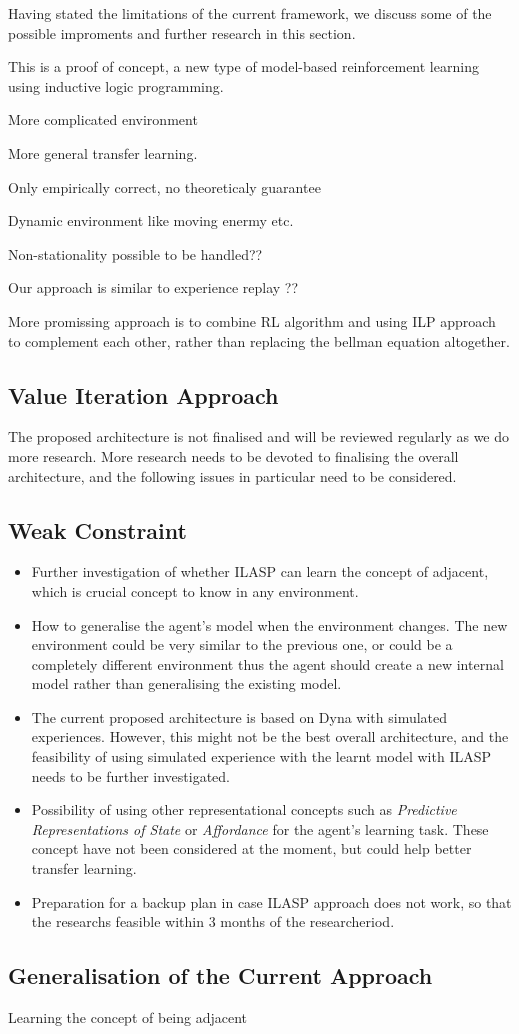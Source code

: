 Having stated the limitations of the current framework, we discuss some of the possible improments and further research in this section.

This is a proof of concept, a new type of model-based reinforcement learning using inductive logic programming. 

More complicated environment

More general transfer learning.

Only empirically correct, no theoreticaly guarantee

Dynamic environment like moving enermy etc.

Non-stationality possible to be handled??

Our approach is similar to experience replay ??

More promissing approach is to combine RL algorithm and using ILP approach to complement each other, rather than replacing the bellman equation altogether. 

\subsection{Value Iteration Approach}

The proposed architecture is not finalised and will be reviewed regularly as we do more research.
More research needs to be devoted to finalising the overall architecture, and the following issues in particular need to be considered.

\subsection{Weak Constraint}

\begin{itemize}

\item Further investigation of whether ILASP can learn the concept of adjacent, which is crucial concept to know in any environment.
\item How to generalise the agent's model when the environment changes. The new environment could be very similar to the previous one, or could be a completely different environment thus the agent should create a new internal model rather than generalising the existing model.
\item The current proposed architecture is based on Dyna with simulated experiences. However, this might not be the best overall architecture, and the feasibility of using simulated experience with the learnt model with ILASP needs to be further investigated.

\item Possibility of using other representational concepts such as \textit{Predictive Representations of State} or \textit{Affordance} \cite{Sridharan2017} for the agent's learning task. These concept have not been considered at the moment, but could help better transfer learning.

\item Preparation for a backup plan in case ILASP approach does not work, so that the researchs feasible within 3 months of the researcheriod.

\end{itemize}

\subsection{Generalisation of the Current Approach}

Learning the concept of being adjacent